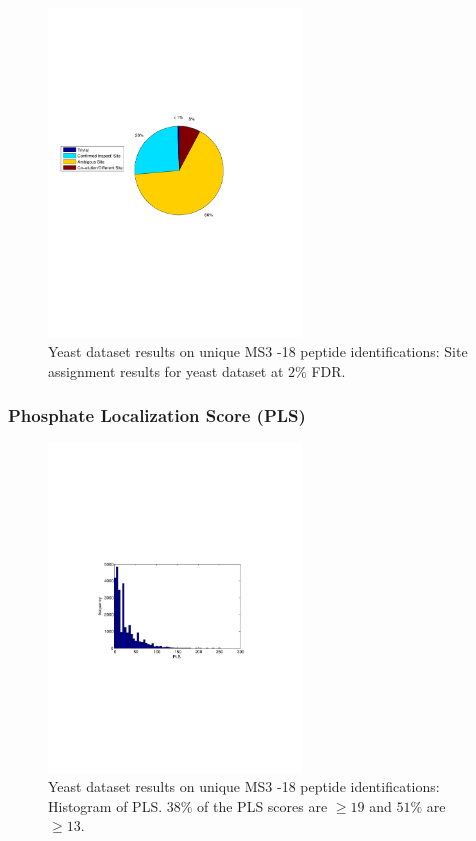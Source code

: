 \begin{figure}[htbp]
\centering %
\includegraphics[trim = 0mm 90mm 20mm 90mm,clip,width=0.6\textwidth]{fig/phospho/uniqueIds/piechart_uniq_by_STYDE.pdf}
\caption{Yeast dataset results on unique MS3 -18 peptide identifications: Site assignment results for yeast dataset at $2\%$ FDR.}
\label{fig:yeast_piechart_uniqIds_STYDE}
\end{figure}

\clearpage
\subsubsection{Phosphate Localization Score (PLS)}
\begin{figure}[htbp]
\centering %
\includegraphics[trim = 0mm 90mm 20mm 90mm,clip,width=0.6\textwidth]{fig/phospho/uniqueIds/PLS_figs/uniqIds_PLS_histogram.pdf}
\caption{Yeast dataset results on unique MS3 -18 peptide identifications: Histogram of PLS. $38\%$ of the PLS scores are $\ge 19$ and $51\%$ are $\ge 13$.}
\label{fig:yeast_pls}
\end{figure}

